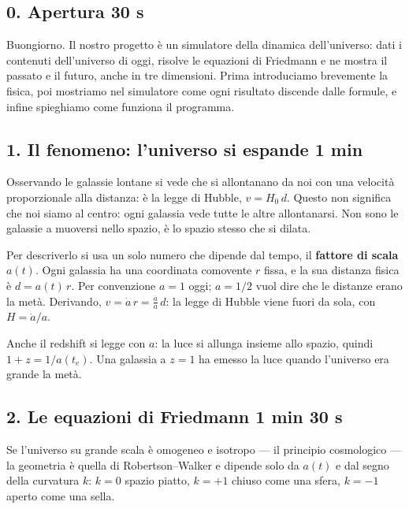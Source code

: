 
\subsection*{0. Apertura \hfill\normalfont\small 30 s}
Buongiorno. Il nostro progetto è un simulatore della dinamica dell'universo: dati i contenuti dell'universo di oggi, risolve le equazioni di Friedmann e ne mostra il passato e il futuro, anche in tre dimensioni.
Prima introduciamo brevemente la fisica, poi mostriamo nel simulatore come ogni risultato discende dalle formule, e infine spieghiamo come funziona il programma.


\subsection*{1. Il fenomeno: l'universo si espande \hfill\normalfont\small 1 min}
Osservando le galassie lontane si vede che si allontanano da noi con una velocità proporzionale alla distanza: è la legge di Hubble, $v = H_0\, d$.
Questo non significa che noi siamo al centro: ogni galassia vede tutte le altre allontanarsi. Non sono le galassie a muoversi nello spazio, è lo spazio stesso che si dilata.

Per descriverlo si usa un solo numero che dipende dal tempo, il \textbf{fattore di scala} $a(t)$. Ogni galassia ha una coordinata comovente $r$ fissa, e la sua distanza fisica è $d = a(t)\,r$. Per convenzione $a = 1$ oggi; $a = 1/2$ vuol dire che le distanze erano la metà.
Derivando, $v = \dot a\, r = \frac{\dot a}{a}\, d$: la legge di Hubble viene fuori da sola, con $H = \dot a / a$.

Anche il redshift si legge con $a$: la luce si allunga insieme allo spazio, quindi $1 + z = 1/a(t_e)$. Una galassia a $z = 1$ ha emesso la luce quando l'universo era grande la metà.

\subsection*{2. Le equazioni di Friedmann \hfill\normalfont\small 1 min 30 s}
Se l'universo su grande scala è omogeneo e isotropo --- il principio cosmologico --- la geometria è quella di Robertson--Walker e dipende solo da $a(t)$ e dal segno della curvatura $k$: $k=0$ spazio piatto, $k=+1$ chiuso come una sfera, $k=-1$ aperto come una sella.

